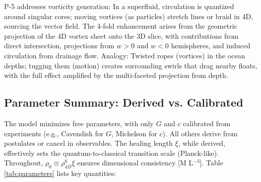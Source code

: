 P-5 addresses vorticity generation: In a superfluid, circulation is quantized around singular cores; moving vortices (as particles) stretch lines or braid in 4D, sourcing the vector field. The 4-fold enhancement arises from the geometric projection of the 4D vortex sheet onto the 3D slice, with contributions from direct intersection, projections from $w>0$ and $w<0$ hemispheres, and induced circulation from drainage flow. Analogy: Twisted ropes (vortices) in the ocean depths; tugging them (motion) creates surrounding swirls that drag nearby floats, with the full effect amplified by the multi-faceted projection from depth.

\subsection{Parameter Summary: Derived vs. Calibrated}

The model minimizes free parameters, with only \(G\) and \(c\) calibrated from experiments (e.g., Cavendish for \(G\), Michelson for \(c\)). All others derive from postulates or cancel in observables. The healing length \(\xi\), while derived, effectively sets the quantum-to-classical transition scale (Planck-like). Throughout, $\rho_0 \equiv \rho_{4D}^0 \xi$ ensures dimensional consistency [M L$^{-3}$]. Table \ref{tab:parameters} lists key quantities:

